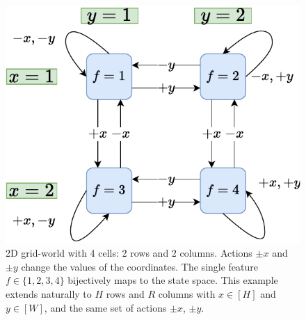 \documentclass[a4paper,11pt,oneside]{report}
\begin{document}
\begin{figure}[t]
    \centering
    \includegraphics[width=0.7\linewidth]{diagrams/env_2d_2x2.pdf}
    \caption{2D grid-world with 4 cells: 2 rows and 2 columns. Actions $\pm x$ and $\pm y$ change the values of the coordinates. The single feature $f\in\{1,2,3,4\}$ bijectively maps to the state space. This example extends naturally to $H$ rows and $R$ columns with $x\in[H]$ and $y\in [W]$, and the same set of actions $\pm x$, $\pm y$.}
    \label{fig:env2d2x2}
\end{figure}
\end{document}
